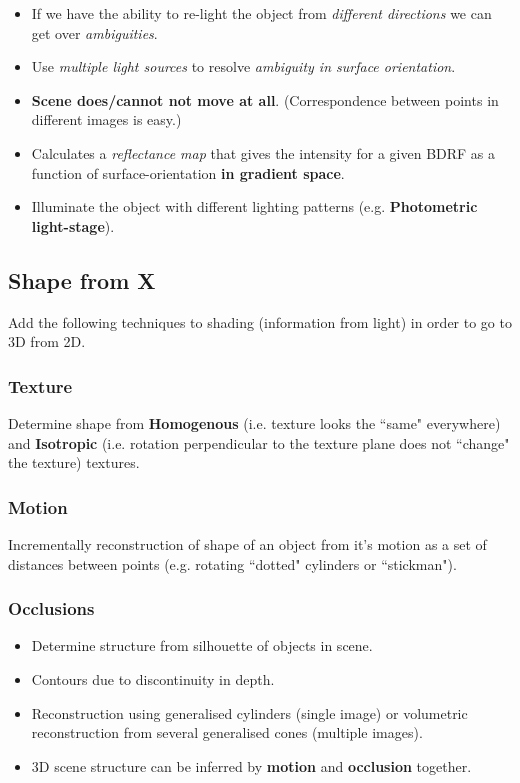 \documentclass[english, 10pt]{article}
\begin{document}
\begin{itemize}
\item If we have the ability to re-light the object from \textit{different directions} we can get over \textit{ambiguities}.
\item Use \textit{multiple light sources} to resolve \textit{ambiguity in surface orientation}. 
\item \textbf{Scene does/cannot not move at all}. (Correspondence between points in different images is easy.)
\item Calculates a \textit{reflectance map} that gives the intensity for a given BDRF as a function of surface-orientation \textbf{in gradient space}.
\item Illuminate the object with different lighting patterns (e.g. \textbf{Photometric light-stage}).
\end{itemize}

\subsection{Shape from X}

Add the following techniques to shading (information from light) in order to go to 3D from 2D. 

\subsubsection{Texture}

Determine shape from \textbf{Homogenous} (i.e. texture looks the ``same" everywhere) and \textbf{Isotropic} (i.e. rotation perpendicular to the texture plane does not ``change" the texture) textures. 

\subsubsection{Motion}

Incrementally reconstruction of shape of an object from it's motion as a set of distances between points (e.g. rotating ``dotted" cylinders or ``stickman"). 

\subsubsection{Occlusions}

\begin{itemize}
\item Determine structure from silhouette of objects in scene.
\item  Contours due to discontinuity in depth. 
\item Reconstruction using generalised cylinders (single image) or volumetric reconstruction from several generalised cones (multiple images).
\item 3D scene structure can be inferred by \textbf{motion} and \textbf{occlusion} together.
\end{itemize}
\end{document}
